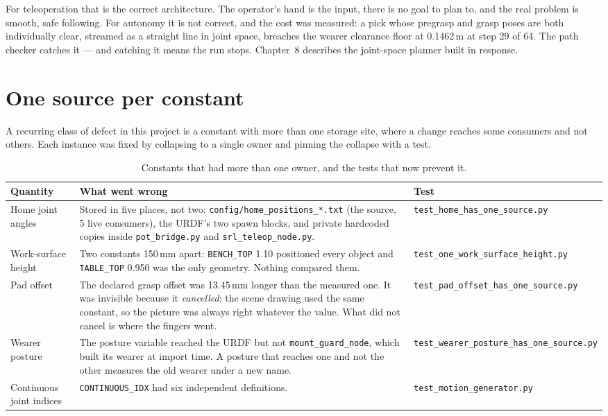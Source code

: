 \documentclass[11pt,a4paper,oneside]{report}
\newcommand{\code}[1]{\texttt{\small #1}}
\newcommand{\file}[1]{\texttt{\small #1}}
\begin{document}
For teleoperation that is the correct architecture. The operator's hand is the
input, there is no goal to plan to, and the real problem is smooth, safe
following. For autonomy it is not correct, and the cost was measured: a pick
whose pregrasp and grasp poses are both individually clear, streamed as a
straight line in joint space, breaches the wearer clearance floor at 0.1462\,m
at step 29 of 64. The path checker catches it --- and catching it means the run
stops. Chapter~8 describes the joint-space planner built in response.

\section{One source per constant}

A recurring class of defect in this project is a constant with more than one
storage site, where a change reaches some consumers and not others. Each
instance was fixed by collapsing to a single owner and pinning the collapse
with a test.

\begin{table}[H]
\centering
\small
\begin{tabularx}{\textwidth}{@{}lXl@{}}
\toprule
\textbf{Quantity} & \textbf{What went wrong} & \textbf{Test} \\
\midrule
Home joint angles &
Stored in five places, not two: \file{config/home\_positions\_*.txt} (the
source, 5 live consumers), the URDF's two spawn blocks, and private hardcoded
copies inside \code{pot\_bridge.py} and \code{srl\_teleop\_node.py}. &
\file{test\_home\_has\_one\_source.py} \\
Work-surface height &
Two constants 150\,mm apart: \code{BENCH\_TOP} 1.10 positioned every object and
\code{TABLE\_TOP} 0.950 was the only geometry. Nothing compared them. &
\file{test\_one\_work\_surface\_height.py} \\
Pad offset &
The declared grasp offset was 13.45\,mm longer than the measured one. It was
invisible because it \emph{cancelled}: the scene drawing used the same
constant, so the picture was always right whatever the value. What did not
cancel is where the fingers went. &
\file{test\_pad\_offset\_has\_one\_source.py} \\
Wearer posture &
The posture variable reached the URDF but not \code{mount\_guard\_node}, which
built its wearer at import time. A posture that reaches one and not the other
measures the old wearer under a new name. &
\file{test\_wearer\_posture\_has\_one\_source.py} \\
Continuous joint indices &
\code{CONTINUOUS\_IDX} had six independent definitions. &
\file{test\_motion\_generator.py} \\
\bottomrule
\end{tabularx}
\caption{Constants that had more than one owner, and the tests that now
prevent it.}
\end{table}
\end{document}
